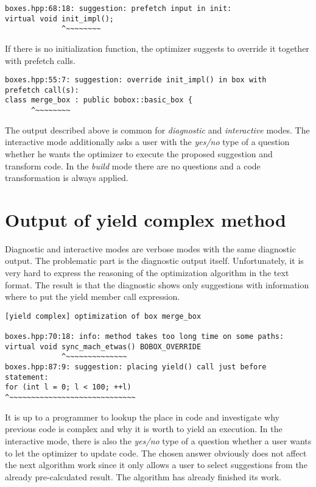 \documentclass[12pt,a4paper]{report}
\begin{document}
\begin{lstlisting}[emph={init\_impl,boxes,hpp},emphstyle={\textbf}]
boxes.hpp:68:18: suggestion: prefetch input in init:
virtual void init_impl();
             ^~~~~~~~~
\end{lstlisting}

If there is no initialization function, the optimizer suggests to override it together with prefetch calls.

\begin{lstlisting}[emph={merge\_box,boxes,hpp},emphstyle={\textbf}]
boxes.hpp:55:7: suggestion: override init_impl() in box with
prefetch call(s):
class merge_box : public bobox::basic_box {
      ^~~~~~~~~
\end{lstlisting}

The output described above is common for \emph{diagnostic} and \emph{interactive} modes. The interactive mode additionally asks a user with the \emph{yes/no} type of a question whether he wants the optimizer to execute the proposed suggestion and transform code. In the \emph{build} mode there are no questions and a code transformation is always applied.

\newpage
\section*{Output of yield complex method}
Diagnostic and interactive modes are verbose modes with the same diagnostic output. The problematic part is the diagnostic output itself. Unfortunately, it is very hard to express the reasoning of the optimization algorithm in the text format. The result is that the diagnostic shows only suggestions with information where to put the yield member call expression.

\begin{lstlisting}[emph={yield,complex,merge\_box,sync\_mach\_etwas,boxes,hpp},emphstyle={\textbf}]
[yield complex] optimization of box merge_box

boxes.hpp:70:18: info: method takes too long time on some paths:
virtual void sync_mach_etwas() BOBOX_OVERRIDE
             ^~~~~~~~~~~~~~~
boxes.hpp:87:9: suggestion: placing yield() call just before
statement:
for (int l = 0; l < 100; ++l)
^~~~~~~~~~~~~~~~~~~~~~~~~~~~~~
\end{lstlisting}

It is up to a programmer to lookup the place in code and investigate why previous code is complex and why it is worth to yield an execution. In the interactive mode, there is also the \emph{yes/no} type of a question whether a user wants to let the optimizer to update code. The chosen answer obviously does not affect the next algorithm work since it only allows a user to select suggestions from the already pre-calculated result. The algorithm has already finished its work.
\end{document}
